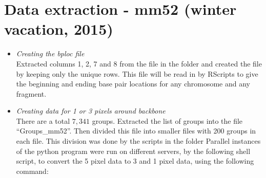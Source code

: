 \documentclass[11pt]{article}
\begin{document}
\section{Data extraction - mm52 (winter vacation, 2015)}
\begin{itemize}
\item \emph{Creating the bploc file} \\
Extracted columns 1, 2, 7 and 8 from the file 
in the folder
and created the file 
by keeping only the unique rows. This file will be read in by RScripts to give the beginning and ending base pair locations for any chromosome and any fragment.
\item \emph{Creating data for 1 or 3 pixels around backbone} \\
There are a total $7,341$ groups. Extracted the list of groups into the file ``Groups\_mm52''. Then divided this file into smaller files with 200 groups in each file. This division was done by the scripts 
in the folder 
Parallel instances of the python program 
were run on different servers, by the following shell script, to convert the 5 pixel data to 3 and 1 pixel data, using the following command:


\end{itemize}
\end{document}
